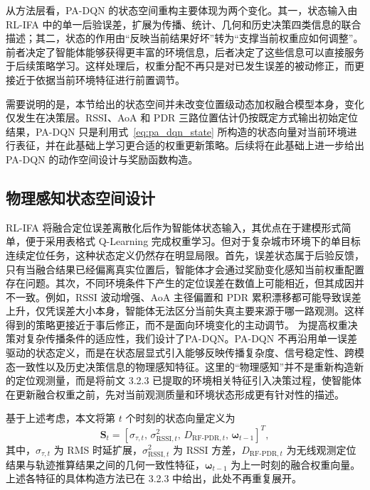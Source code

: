 从方法层看，PA-DQN 的状态空间重构主要体现为两个变化。其一，状态输入由 RL-IFA 中的单一后验误差，扩展为传播、统计、几何和历史决策四类信息的联合描述；其二，状态的作用由“反映当前结果好坏”转为“支撑当前权重应如何调整”。前者决定了智能体能够获得更丰富的环境信息，后者决定了这些信息可以直接服务于后续策略学习。这样处理后，权重分配不再只是对已发生误差的被动修正，而更接近于依据当前环境特征进行前置调节。



需要说明的是，本节给出的状态空间并未改变位置级动态加权融合模型本身，变化仅发生在决策层。RSSI、AoA 和 PDR 三路位置估计仍按既定方式输出初始定位结果，PA-DQN 只是利用式~\eqref{eq:pa_dqn_state} 所构造的状态向量对当前环境进行表征，并在此基础上学习更合适的权重更新策略。后续将在此基础上进一步给出 PA-DQN 的动作空间设计与奖励函数构造。




\subsection{物理感知状态空间设计}

\label{subsec:3_4_1}

RL-IFA 将融合定位误差离散化后作为智能体状态输入，其优点在于建模形式简单，便于采用表格式 Q-Learning 完成权重学习。但对于复杂城市环境下的单目标连续定位任务，这种状态定义仍然存在明显局限。首先，误差状态属于后验反馈，只有当融合结果已经偏离真实位置后，智能体才会通过奖励变化感知当前权重配置存在问题。其次，不同环境条件下产生的定位误差在数值上可能相近，但其成因并不一致。例如，RSSI 波动增强、AoA 主径偏置和 PDR 累积漂移都可能导致误差上升，仅凭误差大小本身，智能体无法区分当前失真主要来源于哪一路观测。这样得到的策略更接近于事后修正，而不是面向环境变化的主动调节。
为提高权重决策对复杂传播条件的适应性，我们设计了PA-DQN。PA-DQN 不再沿用单一误差驱动的状态定义，而是在状态层显式引入能够反映传播复杂度、信号稳定性、跨模态一致性以及历史决策信息的物理感知特征。这里的“物理感知”并不是重新构造新的定位观测量，而是将前文 3.2.3 已提取的环境相关特征引入决策过程，使智能体在更新融合权重之前，先对当前观测质量和环境状态形成更有针对性的描述。

基于上述考虑，本文将第 \(t\) 个时刻的状态向量定义为
\begin{equation}
\mathbf{S}_t=
\left[
\sigma_{\tau,t},\,
\sigma^2_{\mathrm{RSSI},t},\,
D_{\mathrm{RF\mbox{-}PDR},t},\,
\boldsymbol{\omega}_{t-1}
\right]^T,
\label{eq:pa_dqn_state}
\end{equation}
其中，\(\sigma_{\tau,t}\) 为 RMS 时延扩展，\(\sigma^2_{\mathrm{RSSI},t}\) 为 RSSI 方差，\(D_{\mathrm{RF\mbox{-}PDR},t}\) 为无线观测定位结果与轨迹推算结果之间的几何一致性特征，\(\boldsymbol{\omega}_{t-1}\) 为上一时刻的融合权重向量。上述各特征的具体构造方法已在 3.2.3 中给出，此处不再重复展开。

